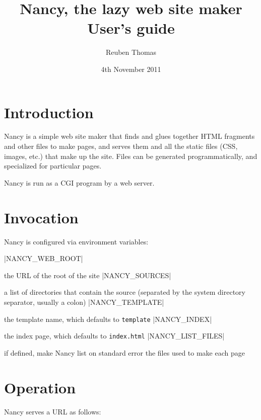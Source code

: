 \documentclass[english]{scrartcl}
\begin{document}
\title{Nancy, the lazy web site maker\\User’s guide}
\date{4th November 2011}
\author{Reuben Thomas}
\maketitle

\section{Introduction}

Nancy is a simple web site maker that finds and glues together HTML fragments and other files to make pages, and serves them and all the static files (CSS, images, etc.) that make up the site. Files can be generated programmatically, and specialized for particular pages.

Nancy is run as a CGI program by a web server.

\section{Invocation}

Nancy is configured via environment variables:

\begin{description}
|NANCY_WEB_ROOT|
\item[\UseVerb{webroot}]the URL of the root of the site
|NANCY_SOURCES|
\item[\UseVerb{sources}]a list of directories that contain the source (separated by the system directory separator, usually a colon)
|NANCY_TEMPLATE|
\item[\UseVerb{template}]the template name, which defaults to \verb|template|
|NANCY_INDEX|
\item[\UseVerb{index}]the index page, which defaults to \verb|index.html|
|NANCY_LIST_FILES|
\item[\UseVerb{listfiles}]if defined, make Nancy list on standard error the files used to make each page
\end{description}

\section{Operation}
\label{operation}

Nancy serves a URL as follows:
\end{document}
